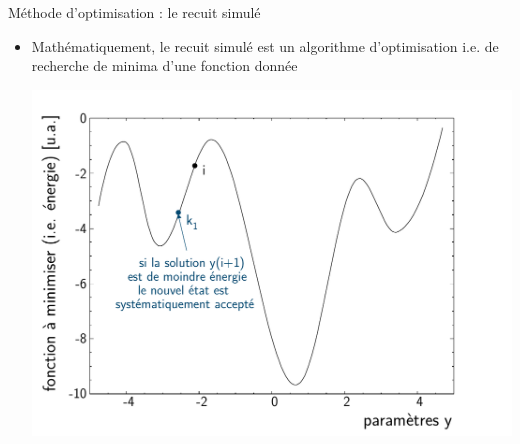 \documentclass[t, compress]{beamer}
\begin{document}
\begin{frame}[c, fragile]{Méthode d'optimisation : le recuit simulé}

  \begin{itemize}

  \item Mathématiquement, le recuit simulé est un algorithme
    d'optimisation i.e. de recherche de minima d'une fonction donnée

    \begin{center}
      \includegraphics[scale=0.5]{figures/sam_2}
    \end{center}

  \end{itemize}

\end{frame}
\end{document}
